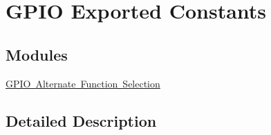 \hypertarget{group___g_p_i_o_ex___exported___constants}{}\section{G\+P\+IO Exported Constants}
\label{group___g_p_i_o_ex___exported___constants}
\subsection*{Modules}
\begin{DoxyCompactItemize}
\item 
\mbox{\hyperlink{group___g_p_i_o___alternate__function__selection}{G\+P\+I\+O Alternate Function Selection}}
\end{DoxyCompactItemize}


\subsection{Detailed Description}
